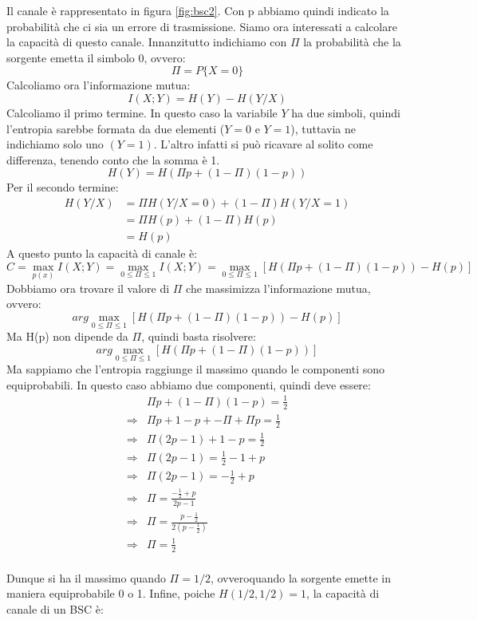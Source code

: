 Il canale è rappresentato in figura \ref{fig:bsc2}. Con p abbiamo quindi indicato la probabilità che ci sia un errore di trasmissione.
Siamo ora interessati a calcolare la capacità di questo canale.
Innanzitutto indichiamo con $\Pi$ la probabilità che la sorgente emetta il simbolo 0, ovvero:
\[
 \Pi=P\{X=0\}
\]
Calcoliamo ora l'informazione mutua:
\[
 I(X;Y)=H(Y)-H(Y/X)
\]
Calcoliamo il primo termine. In questo caso la variabile $Y$ ha due simboli, quindi l'entropia 
sarebbe formata da due elementi ($Y=0$ e $Y=1$), tuttavia ne indichiamo solo uno $(Y=1)$. L'altro infatti si può ricavare 
al solito come differenza, tenendo conto che la somma è 1. 
\[
 H(Y)=H(\Pi p + (1-\Pi)(1-p))
\]
Per il secondo termine:
\[\begin{split}
 H(Y/X)&=\Pi H(Y/X=0) + (1-\Pi) H(Y/X=1) \\
       &=\Pi H(p) + (1-\Pi) H(p) \\
       &=H(p)
  \end{split}
\]
A questo punto la capacità di canale è:
\[
 C=\max_{p(x)} I(X;Y)=\max_{0 \le \Pi \le 1} I(X;Y)=\max_{0 \le \Pi \le 1} [ H(\Pi p + (1-\Pi)(1-p)) - H(p) ]
\]
Dobbiamo ora trovare il valore di $\Pi$ che massimizza l'informazione mutua, ovvero:
\[
 arg \max_{0 \le \Pi \le 1} [ H(\Pi p + (1-\Pi)(1-p)) - H(p) ]
\]
Ma H(p) non dipende da $\Pi$, quindi basta risolvere:
\[
 arg \max_{0 \le \Pi \le 1} [ H(\Pi p + (1-\Pi)(1-p))]
\]
Ma sappiamo che l'entropia raggiunge il massimo quando le componenti sono equiprobabili.
In questo caso abbiamo due componenti, quindi deve essere:
\[\begin{split}
 &\Pi p + (1-\Pi)(1-p)=\frac{1}{2} \\
 \Rightarrow &\Pi p + 1-p + -\Pi +\Pi p=\frac{1}{2} \\ 
 \Rightarrow &\Pi(2p-1) + 1-p =\frac{1}{2} \\ 
 \Rightarrow &\Pi(2p-1) =\frac{1}{2}-1+p \\ 
 \Rightarrow &\Pi(2p-1) =-\frac{1}{2}+p \\
 \Rightarrow &\Pi=\frac{-\frac{1}{2}+p}{2p-1} \\  
 \Rightarrow &\Pi=\frac{p-\frac{1}{2}}{2(p-\frac{1}{2})} \\
 \Rightarrow &\Pi=\frac{1}{2} \\
  \end{split}
\]

\noindent
Dunque si ha il massimo quando $\Pi=1/2$, ovveroquando la sorgente emette in maniera equiprobabile 0 o 1.
Infine, poiche $H(1/2,1/2)=1$, la capacità di canale di un BSC è:


